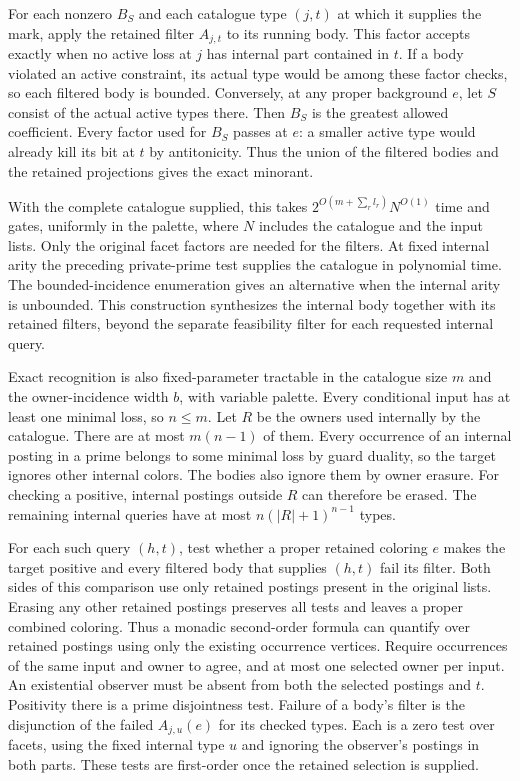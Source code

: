 For each nonzero $B_S$ and each catalogue
type $(j,t)$ at which it supplies the
mark, apply the retained filter $A_{j,t}$
to its running body. This factor accepts
exactly when no active loss at $j$ has
internal part contained in $t$. If a
body violated an active constraint, its
actual type would be among these factor
checks, so each filtered body is bounded.
Conversely, at any proper background
$e$, let $S$ consist of the actual active
types there. Then $B_S$ is the greatest
allowed coefficient. Every factor used
for $B_S$ passes at $e$: a smaller active
type would already kill its bit at $t$
by antitonicity. Thus the union of the
filtered bodies and the retained
projections gives the exact minorant.

With the complete catalogue supplied,
this takes $2^{O(m+\sum_r l_r)}N^{O(1)}$
time and gates, uniformly in the palette,
where $N$ includes the catalogue and the
input lists. Only the original facet
factors are needed for the filters.
At fixed internal arity the preceding
private-prime test supplies the catalogue
in polynomial time. The bounded-incidence
enumeration gives an alternative when the
internal arity is unbounded. This construction
synthesizes the internal body together
with its retained filters, beyond the
separate feasibility filter for each
requested internal query.

Exact recognition is also fixed-parameter
tractable in the catalogue size $m$ and the
owner-incidence width $b$, with variable palette.
Every conditional input has at least one
minimal loss, so $n\leq m$. Let $R$ be the
owners used internally by the catalogue.
There are at most $m(n-1)$ of them.
Every occurrence of an internal posting in
a prime belongs to some minimal loss by
guard duality, so the target ignores other
internal colors. The bodies also ignore
them by owner erasure. For checking a
positive, internal postings outside $R$
can therefore be erased. The remaining
internal queries have at most
$n(|R|+1)^{n-1}$ types.

For each such query $(h,t)$, test whether a
proper retained coloring $e$ makes the
target positive and every filtered body
that supplies $(h,t)$ fail its filter.
Both sides of this comparison use only
retained postings present in the original
lists. Erasing any other retained postings
preserves all tests and leaves a proper
combined coloring. Thus a monadic
second-order formula can quantify over
retained postings using only the existing
occurrence vertices. Require occurrences of
the same input and owner to agree, and
at most one selected owner per input.
An existential observer must be absent
from both the selected postings and $t$.
Positivity there is a prime disjointness
test. Failure of a body's filter is the
disjunction of the failed $A_{j,u}(e)$
for its checked types. Each is a zero
test over facets, using the fixed internal
type $u$ and ignoring the observer's
postings in both parts. These tests are
first-order once the retained selection
is supplied.

